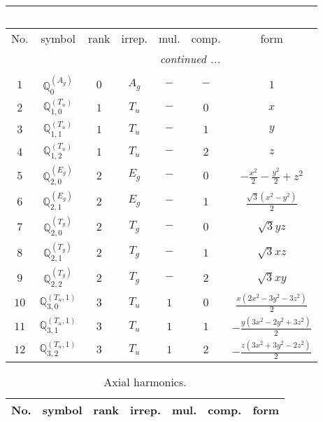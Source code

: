 \documentclass[fleqn,10pt,landscape]{article}
\begin{document}
\begin{itemize}
\begin{center}
\begin{longtable}{ccccccc}
\multicolumn{6}{l}{\tablename\ \thetable{}} \\
 \hline \hline
No. & symbol & rank & irrep. & mul. & comp. & form \\ \hline \endhead

 \hline \hline
\multicolumn{6}{r}{\footnotesize\it continued ...} \\ \endfoot

 \hline \hline
\multicolumn{6}{r}{} \\ \endlastfoot

$ 1 $ & $ \mathbb{Q}_{0}^{(A_{g})} $ & $ 0 $ & $ A_{g} $ & $ - $ & $ - $ & $ 1 $ \\ \hline
$ 2 $ & $ \mathbb{Q}_{1,0}^{(T_{u})} $ & $ 1 $ & $ T_{u} $ & $ - $ & $ 0 $ & $ x $ \\
$ 3 $ & $ \mathbb{Q}_{1,1}^{(T_{u})} $ & $ 1 $ & $ T_{u} $ & $ - $ & $ 1 $ & $ y $ \\
$ 4 $ & $ \mathbb{Q}_{1,2}^{(T_{u})} $ & $ 1 $ & $ T_{u} $ & $ - $ & $ 2 $ & $ z $ \\ \hline
$ 5 $ & $ \mathbb{Q}_{2,0}^{(E_{g})} $ & $ 2 $ & $ E_{g} $ & $ - $ & $ 0 $ & $ - \frac{x^{2}}{2} - \frac{y^{2}}{2} + z^{2} $ \\
$ 6 $ & $ \mathbb{Q}_{2,1}^{(E_{g})} $ & $ 2 $ & $ E_{g} $ & $ - $ & $ 1 $ & $ \frac{\sqrt{3} \left(x^{2} - y^{2}\right)}{2} $ \\
$ 7 $ & $ \mathbb{Q}_{2,0}^{(T_{g})} $ & $ 2 $ & $ T_{g} $ & $ - $ & $ 0 $ & $ \sqrt{3} y z $ \\
$ 8 $ & $ \mathbb{Q}_{2,1}^{(T_{g})} $ & $ 2 $ & $ T_{g} $ & $ - $ & $ 1 $ & $ \sqrt{3} x z $ \\
$ 9 $ & $ \mathbb{Q}_{2,2}^{(T_{g})} $ & $ 2 $ & $ T_{g} $ & $ - $ & $ 2 $ & $ \sqrt{3} x y $ \\ \hline
$ 10 $ & $ \mathbb{Q}_{3,0}^{(T_{u},1)} $ & $ 3 $ & $ T_{u} $ & $ 1 $ & $ 0 $ & $ \frac{x \left(2 x^{2} - 3 y^{2} - 3 z^{2}\right)}{2} $ \\
$ 11 $ & $ \mathbb{Q}_{3,1}^{(T_{u},1)} $ & $ 3 $ & $ T_{u} $ & $ 1 $ & $ 1 $ & $ - \frac{y \left(3 x^{2} - 2 y^{2} + 3 z^{2}\right)}{2} $ \\
$ 12 $ & $ \mathbb{Q}_{3,2}^{(T_{u},1)} $ & $ 3 $ & $ T_{u} $ & $ 1 $ & $ 2 $ & $ - \frac{z \left(3 x^{2} + 3 y^{2} - 2 z^{2}\right)}{2} $ \\
\end{longtable}
\end{center}
\begin{center}
\renewcommand{\arraystretch}{1.3}
\begin{longtable}{ccccccc}
\caption{Axial harmonics.}
 \\
 \hline \hline
No. & symbol & rank & irrep. & mul. & comp. & form \\ \hline \endfirsthead


\end{longtable}
\end{center}
\end{itemize}
\end{document}
